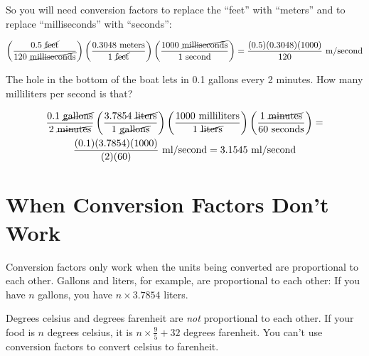 So you will need conversion factors to replace the ``feet'' with ``meters'' and to replace ``milliseconds'' with ``seconds'':

\begin{multline*}
\left(\frac{0.5 \text{ \cancel{feet}}}{120 \text{ \cancel{milliseconds}}}\right) \left( \frac{0.3048 \text{ meters}}{1 \text{ \cancel{feet}}} \right) \left( \frac{ 1000 \text{ \cancel{milliseconds}}} {1 \text{ second}}\right) = \frac{(0.5)(0.3048)(1000)}{120}\text{ m/second}
\end{multline*}

\begin{Exercise}[title={Conversion Factors}, label=conversion_factors]

The hole in the bottom of the boat lets in 0.1 gallons every 2 minutes. How many milliliters per second is that?

\end{Exercise}
\begin{Answer}[ref=conversion_factors]

  \begin{multline*}
    \frac{0.1 \text{ \cancel{gallons}}}{2 \text{ \cancel{minutes}}}
  \left( \frac{3.7854 \text{ \cancel{liters}}}{1 \text{ \cancel{gallons}}} \right)
  \left( \frac{1000 \text{ milliliters}}{1\text{ \cancel{liters}}}\right)
  \left( \frac{1 \text{ \cancel{minutes}}}{60 \text{ seconds}} \right) = \\
  \frac{(0.1)(3.7854)(1000)}{(2)(60)} \text{ ml/second} = 3.1545 \text{ ml/second}
  \end{multline*}

\end{Answer}

\section{When Conversion Factors Don't Work}

Conversion factors only work when the units being converted are
proportional to each other. Gallons and liters, for example, are
proportional to each other: If you have $n$ gallons, you have $n
\times 3.7854$ liters.

Degrees celsius and degrees farenheit are \textit{not} proportional to
each other. If your food is $n$ degrees celsius, it is $n \times
\frac{9}{5} + 32$ degrees farenheit. You can't use conversion factors
to convert celsius to farenheit.
